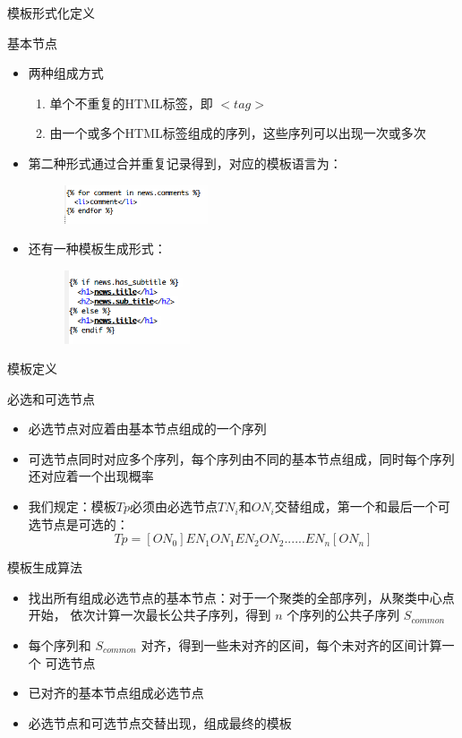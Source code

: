 \begin{frame}[label=sec-2-15]{模板形式化定义}
\begin{block}{基本节点}
\begin{itemize}[<+->]
\item 两种组成方式 
\begin{enumerate}
\item 单个不重复的HTML标签，即 $<tag>$
\item 由一个或多个HTML标签组成的序列，这些序列可以出现一次或多次
\end{enumerate}
\item 第二种形式通过合并重复记录得到，对应的模板语言为：
\begin{figure}[hb]
\centering
\includegraphics[width=0.4\textwidth]{django-for}
\end{figure}
\item 还有一种模板生成形式：
\begin{figure}[hb]
\centering
\includegraphics[width=0.35\textwidth]{django-if}
\end{figure}
\end{itemize}
\end{block}
\end{frame}
\begin{frame}[label=sec-2-16]{模板定义}
\begin{block}{必选和可选节点}
\begin{itemize}
\item 必选节点对应着由基本节点组成的一个序列
\item 可选节点同时对应多个序列，每个序列由不同的基本节点组成，同时每个序列
还对应着一个出现概率
\item 我们规定：模板$Tp$必须由必选节点$TN_i$和$ON_i$交替组成，第一个和最后一个可
  选节点是可选的：
      \[
      Tp=[ON_0]EN_1ON_1EN_2ON_2......EN_n[ON_n] 
      \]
\end{itemize}
\end{block}
\end{frame}

\begin{frame}[label=sec-2-17]{模板生成算法}
\begin{itemize}
\item 找出所有组成必选节点的基本节点：对于一个聚类的全部序列，从聚类中心点开始，
依次计算一次最长公共子序列，得到 $n$ 个序列的公共子序列 $S_{common}$
\item 每个序列和 $S_{common}$ 对齐，得到一些未对齐的区间，每个未对齐的区间计算一个
可选节点
\item 已对齐的基本节点组成必选节点
\item 必选节点和可选节点交替出现，组成最终的模板
\end{itemize}
\end{frame}

